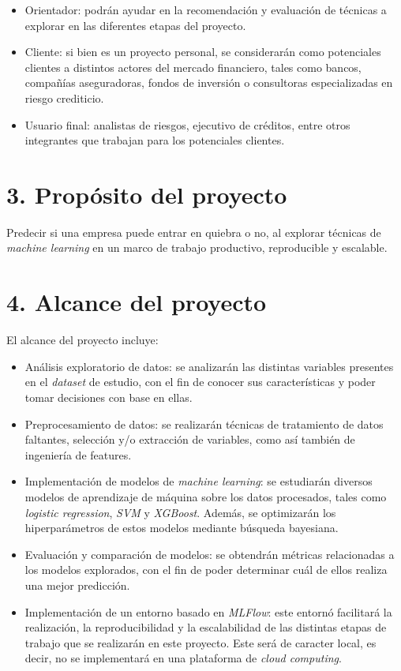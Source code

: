 \documentclass[
11pt, %
]{charter}
\begin{document}
\begin{itemize}
	\item Orientador: podrán ayudar en la recomendación y evaluación de técnicas a explorar en las diferentes etapas del proyecto.
	\item Cliente: si bien es un proyecto personal, se considerarán como potenciales clientes a distintos actores del mercado financiero, tales como bancos, compañías aseguradoras, fondos de inversión o consultoras especializadas en riesgo crediticio.
    \item Usuario final: analistas de riesgos, ejecutivo de créditos, entre otros integrantes que trabajan para los potenciales clientes.
\end{itemize}

\section{3. Propósito del proyecto}
\label{sec:proposito}

Predecir si una empresa puede entrar en quiebra o no, al explorar técnicas de \textit{machine learning} en un marco de trabajo productivo, reproducible y escalable.

\section{4. Alcance del proyecto}
\label{sec:alcance}

El alcance del proyecto incluye:
\begin{itemize}
	\item Análisis exploratorio de datos: se analizarán las distintas variables presentes en el \textit{dataset} de estudio, con el fin de conocer sus características y poder tomar decisiones con base en ellas.
    \item Preprocesamiento de datos: se realizarán técnicas de tratamiento de datos faltantes, selección y/o extracción de variables, como así también de ingeniería de features.
    \item Implementación de modelos de \textit{machine learning}: se estudiarán diversos modelos de aprendizaje de máquina sobre los datos procesados, tales como \textit{logistic regression}, \textit{SVM} y \textit{XGBoost}. Además, se optimizarán los hiperparámetros de estos modelos mediante búsqueda bayesiana.
    \item Evaluación y comparación de modelos: se obtendrán métricas relacionadas a los modelos explorados, con el fin de poder determinar cuál de ellos realiza una mejor predicción.
    \item Implementación de un entorno basado en \textit{MLFlow}: este entornó facilitará la realización, la reproducibilidad y la escalabilidad de las distintas etapas de trabajo que se realizarán en este proyecto. Este será de caracter local, es decir, no se implementará en una plataforma de \textit{cloud computing}.
\end{itemize}
\end{document}
